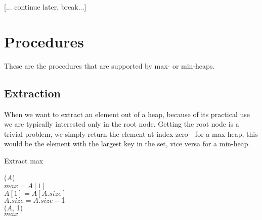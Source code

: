 [... continue later, break...]

\newpage

\section{Procedures}
\label{ch:heaps|sec:procedures}
These are the procedures that are supported by max- or min-heaps.




\subsection{Extraction}
\label{ch:heaps|sec:procedures|sub:extraction}
When we want to extract an element out of a heap, because of its practical use
we are typically interested only in the root node. Getting the root node is a
trivial problem, we simply return the element at index zero - for a max-heap,
this would be the element with the largest key in the set, vice versa for a
min-heap.

\begin{algorithm}[H]
	\caption{Extract max}
	\label{alg:heap-extract-max}
	
	
	
	
	
	\BlankLine
	\ExtractMax($A$) \\
	\Begin
	{
		$max = A[1]$ \\
		$A[1] = A[A.size]$ \\
		$A.size = A.size - 1$ \\
		\MaxHeapify($A$, 1) \\
		\Return $max$
	}
\end{algorithm}

